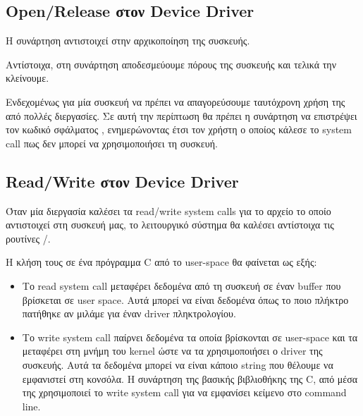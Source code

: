 \documentclass[18pt]{extarticle}
\begin{document}

\subsection{Open/Release στον Device Driver}

Η συνάρτηση  αντιστοιχεί στην αρχικοποίηση της συσκευής.

Αντίστοιχα, στη συνάρτηση  αποδεσμεύουμε πόρους της συσκευής και τελικά την κλείνουμε.

Ενδεχομένως για μία συσκευή να πρέπει να απαγορεύσουμε ταυτόχρονη χρήση της από πολλές διεργασίες.
Σε αυτή την περίπτωση θα πρέπει η συνάρτηση  να επιστρέψει τον κωδικό σφάλματος ,
ενημερώνοντας έτσι τον χρήστη ο οποίος κάλεσε το system call  πως δεν μπορεί να χρησιμοποιήσει τη συσκευή.

\begin{file}
        
\end{file}

\subsection{Read/Write στον Device Driver}

Όταν μία διεργασία καλέσει τα read/write system calls για το αρχείο το οποίο αντιστοιχεί στη συσκευή μας, το λειτουργικό σύστημα
θα καλέσει αντίστοιχα τις ρουτίνες /.

Η κλήση τους σε ένα πρόγραμμα C από το user-space θα φαίνεται ως εξής:

\begin{file}
        
\end{file}

\begin{itemize}
    

    \item Το read system call μεταφέρει δεδομένα από τη συσκευή σε έναν buffer που βρίσκεται σε user space.
Αυτά μπορεί να είναι δεδομένα όπως το ποιο πλήκτρο πατήθηκε αν μιλάμε για έναν driver πληκτρολογίου.

    \item Το write system call παίρνει δεδομένα τα οποία βρίσκονται σε user-space και τα μεταφέρει στη μνήμη του kernel ώστε να τα χρησιμοποιήσει ο driver της συσκευής.
Αυτά τα δεδομένα μπορεί να είναι κάποιο string που θέλουμε να εμφανιστεί στη κονσόλα.
Η συνάρτηση  της βασικής βιβλιοθήκης της C, από μέσα της χρησιμοποιεί το write system call για να εμφανίσει κείμενο στο command line.

\end{itemize}
\end{document}
